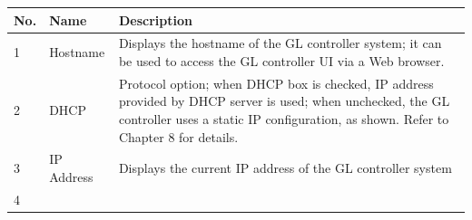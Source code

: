 \begin{longtable}[]{@{}|l|l|l|@{}}
\toprule
\rowcolor{brown}\begin{minipage}[b]{0.04\columnwidth}\raggedright
{\bf{No.}}\strut
\end{minipage} & \begin{minipage}[b]{0.23\columnwidth}\raggedright
{\bf{Name}}\strut
\end{minipage} & \begin{minipage}[b]{0.65\columnwidth}\raggedright
{\bf{Description}}\strut
\end{minipage}\tabularnewline
\midrule
\endhead
\begin{minipage}[t]{0.04\columnwidth}\raggedright
1\strut
\end{minipage} & \begin{minipage}[t]{0.23\columnwidth}\raggedright
Hostname\strut
\end{minipage} & \begin{minipage}[t]{0.65\columnwidth}\raggedright
Displays the hostname of the GL controller system; it can be used to
access the GL controller UI via a Web browser.\strut
\end{minipage}\tabularnewline
\begin{minipage}[t]{0.04\columnwidth}\raggedright
2\strut
\end{minipage} & \begin{minipage}[t]{0.23\columnwidth}\raggedright
DHCP\strut
\end{minipage} & \begin{minipage}[t]{0.65\columnwidth}\raggedright
Protocol option; when DHCP box is checked, IP address provided by DHCP
server is used; when unchecked, the GL controller uses a static IP
configuration, as shown. Refer to Chapter 8 for details.\strut
\end{minipage}\tabularnewline
\begin{minipage}[t]{0.04\columnwidth}\raggedright
3\strut
\end{minipage} & \begin{minipage}[t]{0.23\columnwidth}\raggedright
IP Address\strut
\end{minipage} & \begin{minipage}[t]{0.65\columnwidth}\raggedright
Displays the current IP address of the GL controller system\strut
\end{minipage}\tabularnewline
\begin{minipage}[t]{0.04\columnwidth}\raggedright
4\strut
\end{minipage} & \begin{minipage}[t]{0.23\columnwidth}\raggedright

\end{minipage}
\end{longtable}
